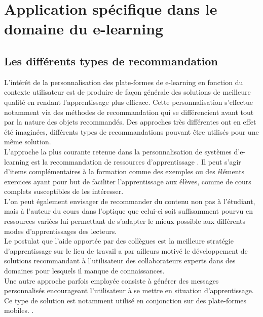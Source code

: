 \documentclass[conference]{./sty/IEEEtran}
\begin{document}
\section{Application spécifique dans le domaine du e-learning}

\subsection{Les différents types de recommandation}

L'intérêt de la personnalisation des plate-formes de e-learning en fonction du
contexte utilisateur est de produire de façon générale des solutions de
meilleure qualité en rendant l'apprentissage plus efficace. Cette
personnalisation s'effectue notamment via des méthodes de recommandation qui se
différencient avant tout par la nature des objets recommandés. Des approches
très différentes ont en effet été imaginées, différents types de
recommandations pouvant être utilisés pour une même solution. \\

L'approche la plus courante retenue dans la personnalisation de systèmes
d'e-learning est la recommandation de ressources d'apprentissage
\cite{DBLP:journals/tlt/VerbertMOWDBD12}. Il peut s'agir d'items
complémentaires à la formation comme des exemples ou des éléments exercices
ayant pour but de faciliter l'apprentissage aux élèves, comme de cours complets
susceptibles de les intéresser. \\

L'on peut également envisager de recommander du contenu non pas à
l'étudiant, mais à l'auteur du cours \cite{smartECourseRecommander} dans
l'optique que celui-ci soit suffisamment pourvu en ressources variées lui
permettant de s'adapter le mieux possible aux différents modes d'apprentissages
des lecteurs. \\

Le postulat que l'aide apportée par des collègues est la meilleure stratégie
d'apprentissage sur le lieu de travail a par ailleurs motivé le développement
de solutions recommandant à l'utilisateur des collaborateurs experts dans des
domaines pour lesquels il manque de
connaissances\cite{DBLP:journals/procedia/BehamKLL10}.\\

Une autre approche parfois employée consiste à générer des messages
personnalisés encourageant l'utilisateur à se mettre en situation
d'apprentissage. Ce type de solution est notamment utilisé en conjonction sur
des plate-formes mobiles. \cite{DBLP:conf/wmte/PetersenM06}. \\
\end{document}

